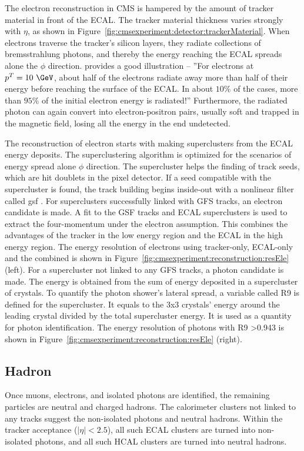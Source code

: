 The electron reconstruction in CMS is hampered by the amount of tracker material in front of the ECAL. The tracker material thickness varies strongly with $\eta$, as shown in Figure~\ref{fig:cmsexperiment:detector:trackerMaterial}. When electrons traverse the tracker's silicon layers, they radiate collections of bremsstrahlung photons, and thereby the energy reaching the ECAL spreads alone the $\phi$ direction. \cite{cms:tdr1:Bayatian:2006nff} provides a good illustration -- ''For electrons at $p^T=10~\GeV$, about half of the electrons radiate away more than half of their energy before reaching the surface of the ECAL. In about $10\%$ of the cases, more than $95\%$ of the initial electron energy is radiated!'' Furthermore, the radiated photon can again convert into electron-positron pairs, usually soft and trapped in the magnetic field, losing all the energy in the end undetected.

The reconstruction of electron starts with making superclusters from the ECAL energy deposits. The superclustering algorithm is optimized for the scenarios of energy spread alone $\phi$ direction. The supercluster helps the finding of track seeds, which are hit doublets in the pixel detector. If a seed compatible with the supercluster is found, the track building begins inside-out with a nonlinear filter called \acrfull{gsf} \cite{tech:gsf:Adam:2005bya}. For superclusters successfully linked with GFS tracks, an electron candidate is made. A fit to the GSF tracks and ECAL superclusters is used to extract the four-momentum under the electron assumption. This combines the advantages of the tracker in the low energy region and the ECAL in the high energy region. The energy resolution of electrons using tracker-only, ECAL-only and the combined is shown in Figure~\ref{fig:cmsexperiment:reconstruction:resEle} (left). For a supercluster not linked to any GFS tracks, a photon candidate is made. The energy is obtained from the sum of energy deposited in a supercluster of crystals. To quantify the photon shower's lateral spread, a variable called R9 is defined for the supercluster. It equals to the 3x3 crystals' energy around the leading crystal divided by the total supercluster energy. It is used as a quantity for photon identification. The energy resolution of photons with R9 >0.943 is shown in Figure~\ref{fig:cmsexperiment:reconstruction:resEle} (right).



\subsection{Hadron}
Once muons, electrons, and isolated photons are identified, the remaining particles are neutral and charged hadrons. The calorimeter clusters not linked to any tracks suggest the non-isolated photons and neutral hadrons. Within the tracker acceptance ($|\eta|< 2.5$), all such ECAL clusters are turned into non-isolated photons, and all such HCAL clusters are turned into neutral hadrons. 

